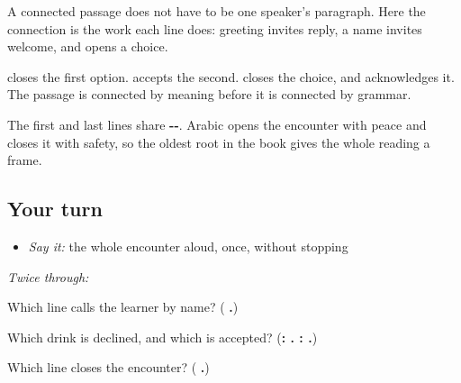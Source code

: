 \begin{cousinweb}
A connected passage does not have to be one speaker's paragraph. Here the connection is the work each line does: greeting invites reply, a name invites welcome, and \textbf{  } opens a choice.

\textbf{} closes the first option. \textbf{} accepts the second. \textbf{} closes the choice, and \textbf{} acknowledges it. The passage is connected by meaning before it is connected by grammar.

The first and last lines share \textbf{--}. Arabic opens the encounter with peace and closes it with safety, so the oldest root in the book gives the whole reading a frame.
\end{cousinweb}

\subsection*{Your turn}
\begin{itemize}
\raggedright
  \item \emph{Say it:} the whole encounter aloud, once, without stopping
\end{itemize}

\emph{Twice through:}

\begin{tcolorbox}[breakable,colback=teal!4,colframe=teal!35!black,title={Before you move on}]
Which line calls the learner by name? (\textbf{  .})

Which drink is declined, and which is accepted? (\textbf{: . : .})

Which line closes the encounter? (\textbf{ .})
\end{tcolorbox}
